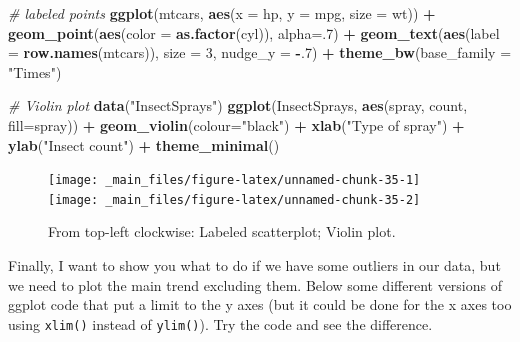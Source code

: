 \documentclass[
]{svmono}
\newenvironment{Shaded}{\begin{snugshade}}{\end{snugshade}}
\newcommand{\AttributeTok}[1]{\textcolor[rgb]{0.13,0.29,0.53}{#1}}
\newcommand{\CommentTok}[1]{\textcolor[rgb]{0.56,0.35,0.01}{\textit{#1}}}
\newcommand{\DecValTok}[1]{\textcolor[rgb]{0.00,0.00,0.81}{#1}}
\newcommand{\FunctionTok}[1]{\textcolor[rgb]{0.13,0.29,0.53}{\textbf{#1}}}
\newcommand{\NormalTok}[1]{#1}
\newcommand{\SpecialCharTok}[1]{\textcolor[rgb]{0.81,0.36,0.00}{\textbf{#1}}}
\newcommand{\StringTok}[1]{\textcolor[rgb]{0.31,0.60,0.02}{#1}}
\begin{document}
\begin{Shaded}
\begin{Highlighting}[]
\CommentTok{\# labeled points}
\FunctionTok{ggplot}\NormalTok{(mtcars, }\FunctionTok{aes}\NormalTok{(}\AttributeTok{x =}\NormalTok{ hp, }\AttributeTok{y =}\NormalTok{ mpg, }\AttributeTok{size =}\NormalTok{ wt)) }\SpecialCharTok{+}
  \FunctionTok{geom\_point}\NormalTok{(}\FunctionTok{aes}\NormalTok{(}\AttributeTok{color =} \FunctionTok{as.factor}\NormalTok{(cyl)), }\AttributeTok{alpha=}\NormalTok{.}\DecValTok{7}\NormalTok{) }\SpecialCharTok{+}
  \FunctionTok{geom\_text}\NormalTok{(}\FunctionTok{aes}\NormalTok{(}\AttributeTok{label =} \FunctionTok{row.names}\NormalTok{(mtcars)), }\AttributeTok{size =} \DecValTok{3}\NormalTok{, }\AttributeTok{nudge\_y =} \SpecialCharTok{{-}}\NormalTok{.}\DecValTok{7}\NormalTok{) }\SpecialCharTok{+}
  \FunctionTok{theme\_bw}\NormalTok{(}\AttributeTok{base\_family =} \StringTok{"Times"}\NormalTok{)}

\CommentTok{\# Violin plot}
\FunctionTok{data}\NormalTok{(}\StringTok{"InsectSprays"}\NormalTok{)}
\FunctionTok{ggplot}\NormalTok{(InsectSprays, }\FunctionTok{aes}\NormalTok{(spray, count, }\AttributeTok{fill=}\NormalTok{spray)) }\SpecialCharTok{+}
  \FunctionTok{geom\_violin}\NormalTok{(}\AttributeTok{colour=}\StringTok{"black"}\NormalTok{) }\SpecialCharTok{+}
  \FunctionTok{xlab}\NormalTok{(}\StringTok{"Type of spray"}\NormalTok{) }\SpecialCharTok{+}
  \FunctionTok{ylab}\NormalTok{(}\StringTok{"Insect count"}\NormalTok{) }\SpecialCharTok{+}
  \FunctionTok{theme\_minimal}\NormalTok{()}
\end{Highlighting}
\end{Shaded}

\begin{figure}[H]
\texttt{[image: \_main\_files/figure-latex/unnamed-chunk-35-1]} \texttt{[image: \_main\_files/figure-latex/unnamed-chunk-35-2]} \caption{From top-left clockwise: Labeled scatterplot; Violin plot.}\label{fig:unnamed-chunk-35}
\end{figure}

Finally, I want to show you what to do if we have some outliers in our
data, but we need to plot the main trend excluding them. Below some
different versions of ggplot code that put a limit to the y axes (but it
could be done for the x axes too using \texttt{xlim()} instead of \texttt{ylim()}).
Try the code and see the difference.
\end{document}
